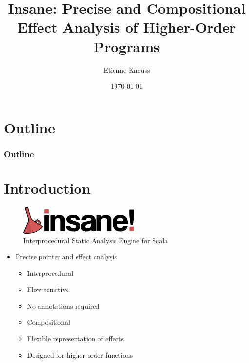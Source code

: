 \documentclass[hyperref={pdfpagelabels=false}]{beamer}
\begin{document}
\title{Insane: Precise and Compositional Effect Analysis of Higher-Order Programs}
\author{Etienne Kneuss}
\date{\today}

\nocite{*}


\begin{frame}
    \titlepage
\end{frame}

\section*{Outline}
\begin{frame}
    \frametitle{Outline}
    \tableofcontents
\end{frame}

\section{Introduction}

\begin{frame}[label=overview]
    \begin{figure}[t]
        \includegraphics[width=60mm]{../../../logo.png}\\
        Interprocedural Static Analysis Engine for Scala
    \end{figure}

    \begin{itemize}
        \item Precise pointer and effect analysis
            \begin{itemize}
                \item Interprocedural
                \item Flow sensitive
                \item No annotations required
                \item Compositional
                \item Flexible representation of effects
                \item Designed for higher-order functions
            \end{itemize}
    \end{itemize}
\end{frame}
\end{document}
